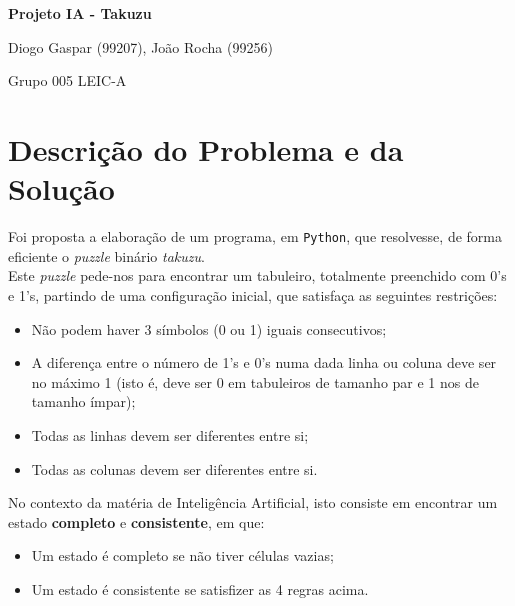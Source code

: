 \documentclass[12pt,a4paper]{article}
\begin{document}
  \begin{titlepage}
    \begin{center}
      \vspace*{5cm}

      \Huge
      \textbf{Projeto IA - Takuzu}

      \vspace{0.5cm}

      \LARGE
      Diogo Gaspar (99207), João Rocha (99256)

      \vspace{0.5cm}
      \Large
      Grupo 005 LEIC-A

      \vfill
    \end{center}
  \end{titlepage}

  \section*{Descrição do Problema e da Solução}

  Foi proposta a elaboração de um programa, em \texttt{Python}, que resolvesse, de forma eficiente o \textit{puzzle} binário \textit{takuzu}. \\

  Este \textit{puzzle} pede-nos para encontrar um tabuleiro, totalmente preenchido com 0's e 1's, partindo de uma configuração inicial, que satisfaça as seguintes restrições:
  \begin{itemize}
    \item Não podem haver 3 símbolos (0 ou 1) iguais consecutivos;
    \item A diferença entre o número de 1's e 0's numa dada linha ou coluna deve ser no máximo 1 (isto é, deve ser 0 em tabuleiros de tamanho par e 1 nos de tamanho ímpar);
    \item Todas as linhas devem ser diferentes entre si;
    \item Todas as colunas devem ser diferentes entre si.
  \end{itemize}

  No contexto da matéria de Inteligência Artificial, isto consiste em encontrar um estado \textbf{completo} e \textbf{consistente}, em que:
  \begin{itemize}
    \item Um estado é completo se não tiver células vazias;
    \item Um estado é consistente se satisfizer as 4 regras acima.
  \end{itemize}
\end{document}
